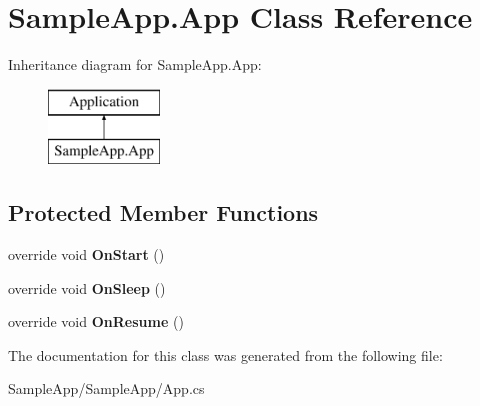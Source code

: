 \hypertarget{class_sample_app_1_1_app}{}\section{Sample\+App.\+App Class Reference}
\label{class_sample_app_1_1_app}
Inheritance diagram for Sample\+App.\+App\+:\begin{figure}[H]
\begin{center}
\leavevmode
\includegraphics[height=2.000000cm]{class_sample_app_1_1_app}
\end{center}
\end{figure}
\subsection*{Protected Member Functions}
\begin{DoxyCompactItemize}
\item 
\mbox{\label{class_sample_app_1_1_app_a4c244eb4add79a88a3942bdafaa79026}} 
override void {\bfseries On\+Start} ()
\item 
\mbox{\label{class_sample_app_1_1_app_a9126ab83b26c394c88e425bff753e1d6}} 
override void {\bfseries On\+Sleep} ()
\item 
\mbox{\label{class_sample_app_1_1_app_a48fd3d0d0078c177621814ee11e39e0f}} 
override void {\bfseries On\+Resume} ()
\end{DoxyCompactItemize}


The documentation for this class was generated from the following file\+:\begin{DoxyCompactItemize}
\item 
Sample\+App/\+Sample\+App/App.\+cs\end{DoxyCompactItemize}
